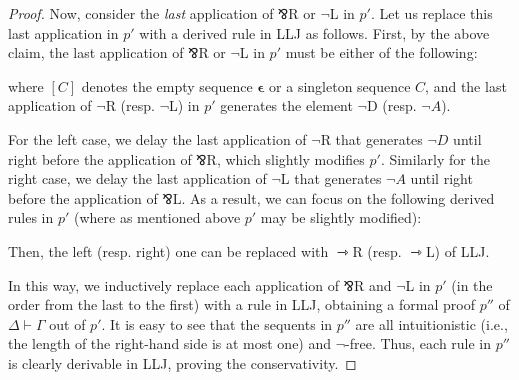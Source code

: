 \documentclass[a4paper]{article}
\theoremstyle{definition}
\theoremstyle{theorem}
\theoremstyle{remark}
\begin{document}
\begin{proof}
Now, consider the \emph{last} application of $\invamp$R or $\neg$L in $p'$.
Let us replace this last application in $p'$ with a derived rule in \textsf{LLJ} as follows.
First, by the above claim, the last application of $\invamp$R or $\neg$L in $p'$ must be either of the following:
where $[C]$ denotes the empty sequence $\boldsymbol{\epsilon}$ or a singleton sequence $C$, and the last application of $\neg$R (resp. $\neg$L) in $p'$ generates the element $\neg$D (resp. $\neg A$).

For the left case, we delay the last application of $\neg$R that generates $\neg D$ until right before the application of $\invamp$R, which slightly modifies $p'$.
Similarly for the right case, we delay the last application of $\neg$L that generates $\neg A$ until right before the application of $\invamp$L.
As a result, we can focus on the following derived rules in $p'$ (where as mentioned above $p'$ may be slightly modified):
Then, the left (resp. right) one can be replaced with $\rightarrowtriangle$R (resp. $\rightarrowtriangle$L) of \textsf{LLJ}.

In this way, we inductively replace each application of $\invamp$R and $\neg$L in $p'$ (in the order from the last to the first) with a rule in \textsf{LLJ}, obtaining a formal proof $p''$ of $\Delta \vdash \Gamma$ out of $p'$.
It is easy to see that the sequents in $p''$ are all intuitionistic (i.e., the length of the right-hand side is at most one) and $\neg$-free.
Thus, each rule in $p''$ is clearly derivable in \textsf{LLJ}, proving the conservativity.
\end{proof}
\end{document}
